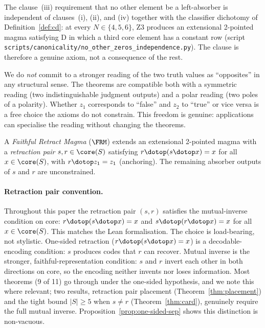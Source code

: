 The clause~(iii) requirement that no other element be a left-absorber
is independent of clauses~(i), (ii), and (iv) together with the
classifier dichotomy of Definition~\ref{def:cd}: at every $N \in \{4, 5, 6\}$,
Z3 produces an extensional 2-pointed magma satisfying D in which a third
core element has a constant row (script
\texttt{scripts/canonicality/no\_other\_zeros\_independence.py}). The
clause is therefore a genuine axiom, not a consequence of the rest.

We do \emph{not} commit to a stronger reading of the two truth values as
``opposites'' in any structural sense. The theorems are compatible both
with a symmetric reading (two indistinguishable judgment outputs) and a
polar reading (two poles of a polarity). Whether $z_1$ corresponds to
``false'' and $z_2$ to ``true'' or vice versa is a free choice the
axioms do not constrain. This freedom is genuine: applications can
specialise the reading without changing the theorems.

\begin{definition}
\label{def:frm}
A \emph{Faithful Retract Magma} ($\FRM$) extends an extensional 2-pointed
magma with a \emph{retraction pair} $s, r \in \core(S)$ satisfying
$r \dotop (s \dotop x) = x$ for all $x \in \core(S)$, with
$r \dotop z_1 = z_1$ (anchoring). The remaining absorber outputs of $s$
and $r$ are unconstrained.
\end{definition}

\paragraph{Retraction pair convention.}
\label{rem:mutual}
Throughout this paper the retraction pair $(s, r)$ satisfies the
mutual-inverse condition on core: $r \dotop (s \dotop x) = x$ and
$s \dotop (r \dotop x) = x$ for all $x \in \core(S)$. This matches the
Lean formalisation. The choice is load-bearing, not stylistic.
One-sided retraction ($r \dotop (s \dotop x) = x$) is a
decodable-encoding condition: $s$ produces codes that $r$ can recover.
Mutual inverse is the stronger, faithful-representation condition: $s$
and $r$ invert each other in both directions on core, so the encoding
neither invents nor loses information. Most theorems (9 of 11) go
through under the one-sided hypothesis, and we note this where relevant;
two results, retraction pair placement (Theorem~\ref{thm:placement}) and
the tight bound $|S| \geq 5$ when $s \neq r$ (Theorem~\ref{thm:card}),
genuinely require the full mutual inverse.
Proposition~\ref{prop:one-sided-sep} shows this distinction is
non-vacuous.

